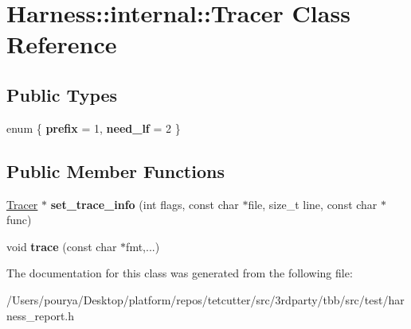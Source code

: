 \hypertarget{classHarness_1_1internal_1_1Tracer}{}\section{Harness\+:\+:internal\+:\+:Tracer Class Reference}
\label{classHarness_1_1internal_1_1Tracer}
\subsection*{Public Types}
\begin{DoxyCompactItemize}
\item 
\hypertarget{classHarness_1_1internal_1_1Tracer_a486d81a1f8fb0d6b699b409085cf0086}{}enum \{ {\bfseries prefix} = 1, 
{\bfseries need\+\_\+lf} = 2
 \}\label{classHarness_1_1internal_1_1Tracer_a486d81a1f8fb0d6b699b409085cf0086}

\end{DoxyCompactItemize}
\subsection*{Public Member Functions}
\begin{DoxyCompactItemize}
\item 
\hypertarget{classHarness_1_1internal_1_1Tracer_a3750f3762db2a9cf56d359e516c37abe}{}\hyperlink{classHarness_1_1internal_1_1Tracer}{Tracer} $\ast$ {\bfseries set\+\_\+trace\+\_\+info} (int flags, const char $\ast$file, size\+\_\+t line, const char $\ast$func)\label{classHarness_1_1internal_1_1Tracer_a3750f3762db2a9cf56d359e516c37abe}

\item 
\hypertarget{classHarness_1_1internal_1_1Tracer_ae06ca5e488d7ef9ce45e086e40653899}{}void {\bfseries trace} (const char $\ast$fmt,...)\label{classHarness_1_1internal_1_1Tracer_ae06ca5e488d7ef9ce45e086e40653899}

\end{DoxyCompactItemize}


The documentation for this class was generated from the following file\+:\begin{DoxyCompactItemize}
\item 
/\+Users/pourya/\+Desktop/platform/repos/tetcutter/src/3rdparty/tbb/src/test/harness\+\_\+report.\+h\end{DoxyCompactItemize}
